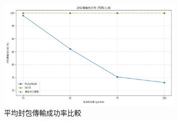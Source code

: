 \begin{ZhChapter}
\begin{figure}[H]
    \centering
    \includegraphics[width = 0.8\textwidth]{image/PDR_Comparison.png}
    \caption{平均封包傳輸成功率比較}
    \label{fig: pdr}
\end{figure}

\end{ZhChapter}